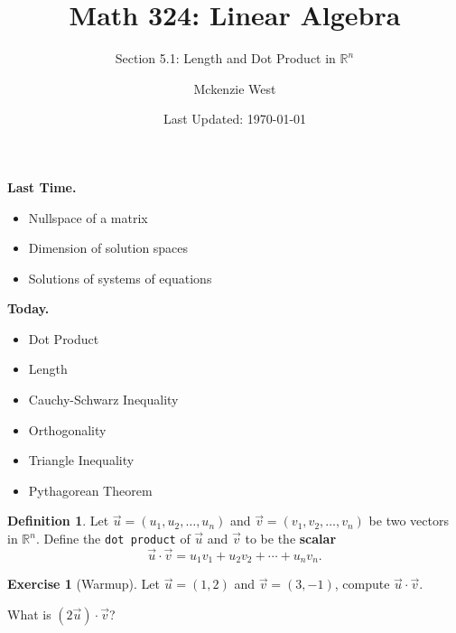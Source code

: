 \documentclass{beamer}
\newcommand{\R}{\mathbb{R}}
\newcommand{\vecu}{\vec{u}}
\newcommand{\fn}{\insertframenumber}
\theoremstyle{definition}
\newtheorem{exercise}{Exercise}
\newtheorem*{defn}{Definition}
\renewcommand{\emph}[1]{{\color{blue}\texttt{#1}}}
\begin{document}
	\title{Math 324: Linear Algebra}
	\subtitle{Section 5.1: Length and Dot Product in $\R^n$}
	\author{Mckenzie West}
	\date{Last Updated: \today}
\begin{frame}
\maketitle
\end{frame}

\begin{frame}{\insertframenumber}
	\begin{block}{\textbf{Last Time.}}
	\begin{itemize}[label=--]
		\item Nullspace of a matrix
		\item Dimension of solution spaces
		\item Solutions of systems of equations
	\end{itemize}
	\end{block}
	\begin{block}{\textbf{Today.}}
		\begin{itemize}[label=--]
			\item Dot Product
			\item Length
			\item Cauchy-Schwarz Inequality
			\item Orthogonality
			\item Triangle Inequality
			\item Pythagorean Theorem
		\end{itemize}
	\end{block}
\end{frame}
\begin{frame}{\fn}
	\begin{defn}
		Let $\vec u=(u_1,u_2,\dots,u_n)$ and $\vec v=(v_1,v_2,\dots,v_n)$ be two vectors in $\R^n$.  Define the \emph{dot product} of $\vec u$ and $\vec v$ to be the \textbf{scalar}
			\[\vec u\cdot\vec v=u_1v_1+u_2v_2+\cdots+u_nv_n.\]
	\end{defn}
	\begin{exercise}[Warmup]
		Let $\vec u=(1,2)$ and $\vec v=(3,-1)$, compute $\vec u\cdot \vec v$.  
		
		What is $(2\vecu)\cdot\vec v$?
	\end{exercise}
\end{frame}
\end{document}
